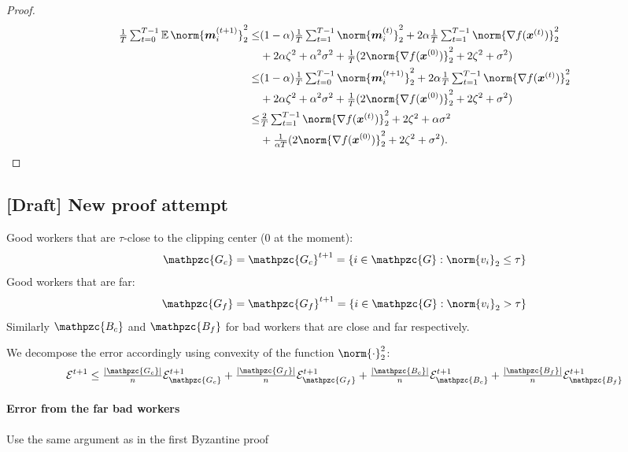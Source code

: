 \documentclass{article}
\newcommand{\gset}{\ensuremath{{\mathpzc{G}}}}
\newcommand{\gcset}{\ensuremath{{\mathpzc{G_c}}}}
\newcommand{\bcset}{\ensuremath{{\mathpzc{B_c}}}}
\newcommand{\gfset}{\ensuremath{{\mathpzc{G_f}}}}
\newcommand{\bfset}{\ensuremath{{\mathpzc{B_f}}}}
\begin{document}
\begin{proof}
\begin{align*}
    \tfrac{1}{T}\tsum_{t=0}^{T-1}
    \E\norm{\mm_i^{(t+1)}}_2^2
    \le &
    (1-\alpha) \tfrac{1}{T}\tsum_{t=1}^{T-1} \norm{\mm_i^{(t)} }_2^2
    +  2\alpha \tfrac{1}{T}\tsum_{t=1}^{T-1} \norm{\nabla f(\xx^{(t)}) }_2^2 \\
        &
    +  2\alpha  \zeta^2
    + \alpha^2\sigma^2
    + \tfrac{1}{T}(2\norm{\nabla f(\xx^{(0)}) }_2^2
    + 2 \zeta^2
    + \sigma^2)                                                              \\
    \le &
    (1-\alpha) \tfrac{1}{T}\tsum_{t=0}^{T-1} \norm{\mm_i^{(t+1)} }_2^2
    +  2\alpha \tfrac{1}{T}\tsum_{t=1}^{T-1} \norm{\nabla f(\xx^{(t)}) }_2^2 \\
        &
    +  2\alpha  \zeta^2
    + \alpha^2\sigma^2
    + \tfrac{1}{T}(2\norm{\nabla f(\xx^{(0)}) }_2^2
    + 2 \zeta^2
    + \sigma^2)                                                              \\
    \le &
    \tfrac{2}{T}\tsum_{t=1}^{T-1} \norm{\nabla f(\xx^{(t)}) }_2^2
    +  2  \zeta^2
    + \alpha\sigma^2                                                         \\
        & + \tfrac{1}{\alpha T}(2\norm{\nabla f(\xx^{(0)}) }_2^2
    + 2 \zeta^2
    + \sigma^2).
  \end{align*}
\end{proof}


\subsection{[Draft] New proof attempt}


Good workers that are $\tau$-close to the clipping center ($0$ at the moment):
\[
  \gcset = \gcset^{t+1} = \{i \in \gset : \norm{v_i}_2 \leq \tau \}
\]
Good workers that are far:
\[
  \gfset = \gfset^{t+1} = \{i \in \gset : \norm{v_i}_2 > \tau \}
\]
Similarly $\bcset$ and $\bfset$ for bad workers that are close and far respectively.

We decompose the error accordingly using convexity of the function $\norm{\cdot}_2^2$:
\[
  \cE^{t+1}
  \le
  \tfrac{|\gcset|}{n} \cE_\gcset^{t+1}
  + \tfrac{|\gfset|}{n} \cE_\gfset^{t+1}
  + \tfrac{|\bcset|}{n} \cE_\bcset^{t+1}
  + \tfrac{|\bfset|}{n} \cE_\bfset^{t+1}
\]


\paragraph*{Error from the far bad workers}

Use the same argument as in the first Byzantine proof 
\end{document}
